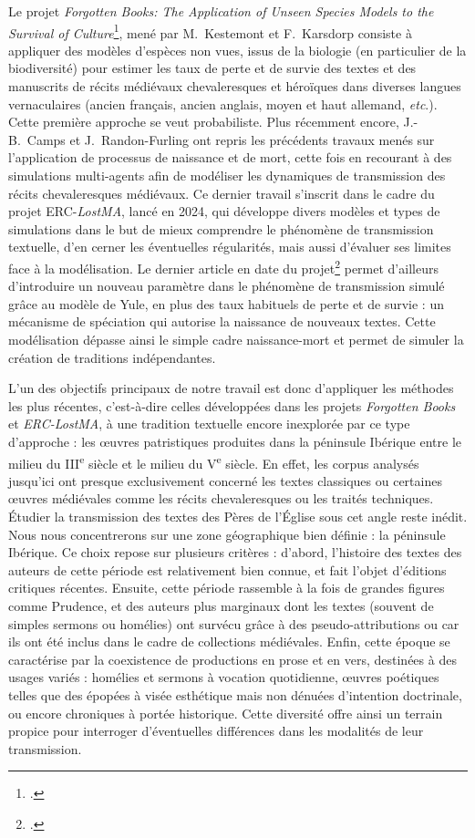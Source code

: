 \documentclass[a4paper,twoside,12pt]{book}
\begin{document}
Le projet \textit{Forgotten Books: The Application of Unseen Species Models to the Survival of Culture}\footcite{kestemont}, mené par M.~Kestemont et F.~Karsdorp consiste à appliquer des modèles d'espèces non vues, issus de la biologie (en particulier de la biodiversité) pour estimer les taux de perte et de survie des textes et des manuscrits de récits médiévaux chevaleresques et héroïques dans diverses langues vernaculaires (ancien français, ancien anglais, moyen et haut allemand, \textit{etc}.). Cette première approche se veut probabiliste. Plus récemment encore, J.-B.~Camps et J.~Randon-Furling ont repris les précédents travaux menés sur l’application de processus de naissance et de mort, cette fois en recourant à des simulations multi-agents afin de modéliser les dynamiques de transmission des récits chevaleresques médiévaux. Ce dernier travail s'inscrit dans le cadre du projet ERC-\textit{LostMA}, lancé en 2024, qui développe divers modèles et types de simulations dans le but de mieux comprendre le phénomène de transmission textuelle, d’en cerner les éventuelles régularités, mais aussi d’évaluer ses limites face à la modélisation. Le dernier article en date du projet\footcite{yule12tree} permet d'ailleurs d'introduire un nouveau paramètre dans le phénomène de transmission simulé grâce au modèle de Yule, en plus des taux habituels de perte et de survie : un mécanisme de spéciation qui autorise la naissance de nouveaux textes. Cette modélisation dépasse ainsi le simple cadre naissance-mort et permet de simuler la création de traditions indépendantes.


L'un des objectifs principaux de notre travail est donc d'appliquer les méthodes les plus récentes, c'est-à-dire celles développées dans les projets \textit{Forgotten Books} et \textit{ERC-LostMA}, à une tradition textuelle encore inexplorée par ce type d’approche : les œuvres patristiques produites dans la péninsule Ibérique entre le milieu du III\textsuperscript{e} siècle et le milieu du V\textsuperscript{e} siècle. En effet, les corpus analysés jusqu’ici ont presque exclusivement concerné les textes classiques ou certaines œuvres médiévales comme les récits chevaleresques ou les traités techniques. Étudier la transmission des textes des Pères de l’Église sous cet angle reste inédit. Nous nous concentrerons sur une zone géographique bien définie : la péninsule Ibérique. Ce choix repose sur plusieurs critères : d’abord, l’histoire des textes des auteurs de cette période est relativement bien connue, et fait l’objet d’éditions critiques récentes. Ensuite, cette période rassemble à la fois de grandes figures comme Prudence, et des auteurs plus marginaux dont les textes (souvent de simples sermons ou homélies) ont survécu grâce à des pseudo-attributions ou car ils ont été inclus dans le cadre de collections médiévales. Enfin, cette époque se caractérise par la coexistence de productions en prose et en vers, destinées à des usages variés : homélies et sermons à vocation quotidienne, œuvres poétiques telles que des épopées à visée esthétique mais non dénuées d’intention doctrinale, ou encore chroniques à portée historique. Cette diversité offre ainsi un terrain propice pour interroger d’éventuelles différences dans les modalités de leur transmission.
\end{document}

